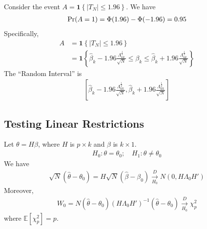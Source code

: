\documentclass[11pt]{elegantbook}
\begin{document}
Consider the event $A=\mathbf{1}\left\{|T_N|\leq 1.96\right\}$. We have
\begin{equation}
    \begin{aligned}
        \textnormal{Pr}(A=1)=\Phi(1.96)-\Phi(-1.96)=0.95
    \end{aligned}
    \nonumber
\end{equation}
Specifically,
\begin{equation}
    \begin{aligned}
        A&=\mathbf{1}\left\{|T_N|\leq 1.96\right\}\\
        &=\mathbf{1}\left\{\hat{\beta}_k-1.96\frac{\Lambda_{kk}^{\frac{1}{2}}}{\sqrt{N}}\leq\beta_k\leq \hat{\beta}_k+1.96\frac{\Lambda_{kk}^{\frac{1}{2}}}{\sqrt{N}}\right\}
    \end{aligned}
    \nonumber
\end{equation}
The ``Random Interval'' is
\begin{equation}
    \begin{aligned}
        \left[\hat{\beta}_k-1.96\frac{\Lambda_{kk}^{\frac{1}{2}}}{\sqrt{N}}, \hat{\beta}_k+1.96\frac{\Lambda_{kk}^{\frac{1}{2}}}{\sqrt{N}}\right]
    \end{aligned}
    \nonumber
\end{equation}


\subsection*{Testing Linear Restrictions}
Let $\theta=H\beta$, where $H$ is $p\times k$ and $\beta$ is $k\times 1$.
\begin{equation}
    \begin{aligned}
        H_0: \theta=\theta_0;\quad H_1:\theta\neq \theta_0
    \end{aligned}
    \nonumber
\end{equation}
We have
\begin{equation}
    \begin{aligned}
        \sqrt{N}(\hat{\theta}-\theta_0)=H\sqrt{N}\left(\hat{\beta}-\beta_0\right)\xrightarrow[H_0]{D} N(0,H\Lambda_0 H')
    \end{aligned}
    \nonumber
\end{equation}
Moreover,
\begin{equation}
    \begin{aligned}
        W_0=N\left(\hat{\theta}-\theta_0\right)(H\Lambda_0 H')^{-1}\left(\hat{\theta}-\theta_0\right)\xrightarrow[H_0]{D}\chi_p^2
    \end{aligned}
    \nonumber
\end{equation}
where $\mathbb{E}[\chi_p^2]=p$.
\end{document}
